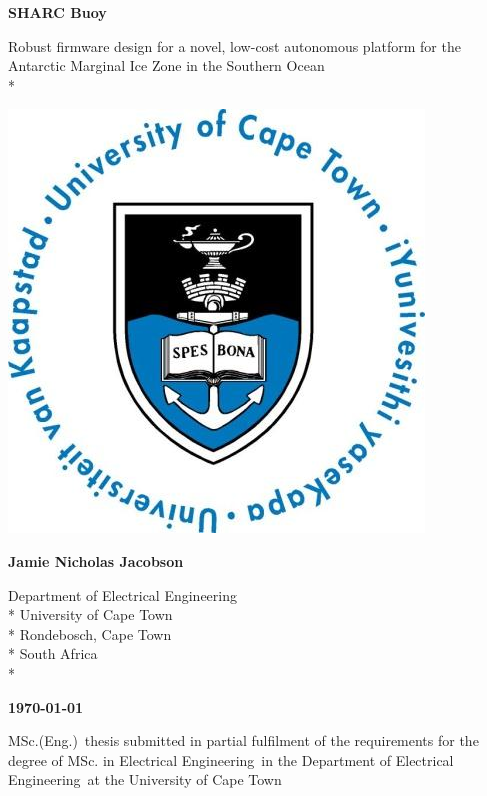 \documentclass[a4paper, 12pt, oneside, openright, parskip=full]{book}
\newcommand{\auth}{Jamie Nicholas Jacobson}								%
\newcommand{\titl}{SHARC Buoy}						%
\newcommand{\subtitle}{Robust firmware design for a novel, low-cost autonomous platform for the Antarctic Marginal Ice Zone in the Southern Ocean}%
\newcommand{\dept}{Department of Electrical Engineering}%
\newcommand{\uni}{University of Cape Town}				%
\newcommand{\city}{Rondebosch, Cape Town}				%
\newcommand{\country}{South Africa}						%
\newcommand{\degre}{MSc. in Electrical Engineering}		%
\newcommand{\degreeabv}{MSc.(Eng.)}						%
\newcommand{\supervisor}{R.A. Verrinder}				%
\newcommand{\logo}										%
{	
	\includegraphics[scale = 0.3]{figs/uctLogo}
}
\begin{document}
\begin{titlepage}
	\centering
	\vspace*{1cm}

	\begin{Huge}					
		\bfseries\titl\par
		\vskip 5mm
	\end{Huge}
	\begin{Large}					
		\subtitle\\*
		\vskip 3cm
	\end{Large}
	\logo							
	\vskip 1.5cm	
	\begin{Large}					
		\bfseries\auth\\
	\end{Large}
	\begin{normalsize}				
		\vskip 2mm	
		\dept\\*
		\uni\\*
		\city\\*
		\country\\*
		
		\vskip 10mm	
	\end{normalsize}
	\begin{Large}					
		{\bfseries \mydate\today}
		\vskip 10mm	
	\end{Large}
		\degreeabv\ thesis submitted in partial fulfilment of the requirements for the degree of \degre\ in the \dept\ at the \uni
		

\end{titlepage}
\end{document}
